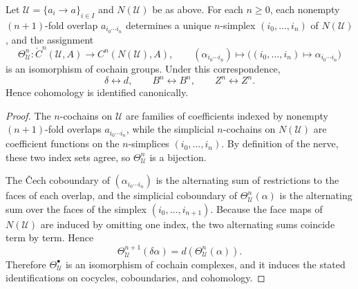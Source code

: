 \begin{proposition}\label{prop:finite-nerve-comparison}
Let $\mathcal U=\{a_i\to a\}_{i\in I}$ and $N(\mathcal U)$ be as above. For each $n\ge 0$, each nonempty $(n{+}1)$-fold overlap $a_{i_0\cdots i_n}$ determines a unique $n$-simplex $(i_0,\dots,i_n)$ of $N(\mathcal U)$, and the assignment
\[
\Theta_{\mathcal U}^n:\check C^n(\mathcal U,A)\to C^n(N(\mathcal U),A),\qquad
(\alpha_{i_0\cdots i_n})\longmapsto\bigl((i_0,\dots,i_n)\mapsto \alpha_{i_0\cdots i_n}\bigr)
\]
is an isomorphism of cochain groups. Under this correspondence,
\[
\delta\leftrightarrow d,\qquad
B^n\leftrightarrow B^n,\qquad
Z^n\leftrightarrow Z^n.
\]
Hence cohomology is identified canonically.
\end{proposition}
\begin{proof}
The $n$-cochains on $\mathcal U$ are families of coefficients indexed by nonempty $(n{+}1)$-fold overlaps $a_{i_0\cdots i_n}$, while the simplicial $n$-cochains on $N(\mathcal U)$ are coefficient functions on the $n$-simplices $(i_0,\dots,i_n)$. By definition of the nerve, these two index sets agree, so $\Theta_{\mathcal U}^n$ is a bijection.

The \v{C}ech coboundary of $(\alpha_{i_0\cdots i_n})$ is the alternating sum of restrictions to the faces of each overlap, and the simplicial coboundary of $\Theta_{\mathcal U}^n(\alpha)$ is the alternating sum over the faces of the simplex $(i_0,\dots,i_{n+1})$. Because the face maps of $N(\mathcal U)$ are induced by omitting one index, the two alternating sums coincide term by term. Hence
\[
\Theta_{\mathcal U}^{n+1}(\delta\alpha)=d(\Theta_{\mathcal U}^n(\alpha)).
\]
Therefore $\Theta_{\mathcal U}^\bullet$ is an isomorphism of cochain complexes, and it induces the stated identifications on cocycles, coboundaries, and cohomology.
\end{proof}

